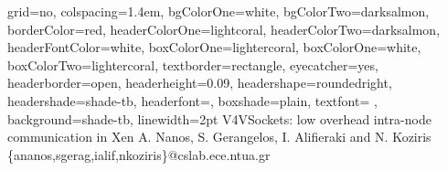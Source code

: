 \documentclass[a0paper,portrait,final]{baposter}
\begin{document}
\newlength{\leftimgwidth}
\begin{poster}%
  {
  grid=no,
  colspacing=1.4em,
  bgColorOne=white,
  bgColorTwo=darksalmon,
  borderColor=red,
  headerColorOne=lightcoral,
  headerColorTwo=darksalmon,
  headerFontColor=white,
  boxColorOne=lightercoral,
  boxColorOne=white,
  boxColorTwo=lightercoral,
  textborder=rectangle,
  eyecatcher=yes,
  headerborder=open,
  headerheight=0.09\textheight,
  headershape=roundedright,
  headershade=shade-tb,
  headerfont=\Large\textsf, %
  boxshade=plain,
  textfont={ },
  background=shade-tb,
  linewidth=2pt
  }
  {
   }
  {V4VSockets: low overhead intra-node communication in Xen}
  {A. Nanos, S. Gerangelos, I. Alifieraki and N. Koziris\\ \{ananos,sgerag,ialif,nkoziris\}@cslab.ece.ntua.gr}
  {   
   }

\end{poster}
\end{document}
